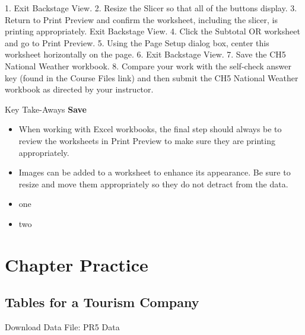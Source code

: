 1. Exit Backstage View.
2. Resize the Slicer so that all of the buttons display.
3. Return to Print Preview and confirm the worksheet, including the slicer, is printing
appropriately. Exit Backstage View.
4. Click the Subtotal OR worksheet and go to Print Preview.
5. Using the Page Setup dialog box, center this worksheet horizontally on the page.
6. Exit Backstage View.
7. Save the CH5 National Weather workbook.
8. Compare your work with the self-check answer key (found in the Course Files link) and then
submit the CH5 National Weather workbook as directed by your instructor.

\begin{center}
	\begin{tkwbox}{Key Take-Aways}
		\textbf{Save}
		\\
		\begin{itemize}
			\setlength{\itemsep}{0pt}
			\setlength{\parskip}{0pt}
			\setlength{\parsep}{0pt}

			\item When working with Excel workbooks, the final step should always be to review the worksheets in Print Preview to make sure they are printing appropriately.
			\item Images can be added to a worksheet to enhance its appearance. Be sure to resize and move them appropriately so they do not detract from the data.
			
			\item one
			\item two
			
		\end{itemize}
	\end{tkwbox}
\end{center}


\section{Chapter Practice}




\subsection{Tables for a Tourism Company}

Download Data File: PR5 Data

